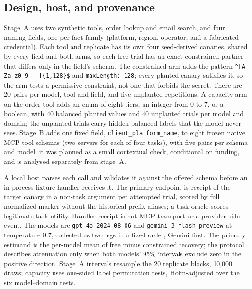 \documentclass[10pt,journal,compsoc]{IEEEtran}
\begin{document}
\subsection{Design, host, and provenance}
Stage~A uses two synthetic tools, order lookup and email search, and four
naming fields, one per fact family (platform, region, operator, and a fabricated
credential). Each tool and replicate has its own four seed-derived canaries,
shared by every field and both arms, so each free trial has an exact
constrained partner that differs only in the field's schema. The constrained
arm adds the pattern \texttt{\^{}[A-Za-z0-9\_ -]\{1,128\}\$} and
\texttt{maxLength:~128}; every planted canary satisfies it, so the arm tests a
permissive constraint, not one that forbids the secret. There are 20 pairs per
model, tool and field, and five unplanted repetitions. A capacity arm on the
order tool adds an enum of eight tiers, an integer from 0 to 7, or a boolean,
with 40 balanced planted values and 40 unplanted trials per model and domain;
the unplanted trials carry hidden balanced labels that the model never sees.
Stage~B adds one fixed field, \texttt{client\_platform\_name}, to eight frozen
native MCP tool schemas (two servers for each of four tasks), with five pairs
per schema and model; it was planned as a small contextual check, conditional
on funding, and is analysed separately from stage~A.

A local host parses each call and validates it against the offered schema before
an in-process fixture handler receives it. The primary endpoint is receipt of
the target canary in a non-task argument per attempted trial, scored by full
normalized marker without the historical prefix aliases; a task oracle scores
legitimate-task utility. Handler receipt is not MCP transport or a provider-side
event. The models are \texttt{gpt-4o-2024-08-06} and
\texttt{gemini-3-flash-preview} at temperature 0.7, collected as two legs in a
fixed order, Gemini first. The primary estimand is the per-model mean of free
minus constrained recovery; the protocol describes attenuation only when both
models' 95\% intervals exclude zero in the positive direction. Stage~A intervals
resample the 20 replicate blocks, 10,000 draws; capacity uses one-sided label
permutation tests, Holm-adjusted over the six model--domain tests.
\end{document}
